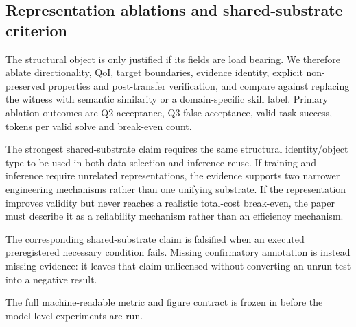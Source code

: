\subsection{Representation ablations and shared-substrate criterion}

The structural object is only justified if its fields are load bearing. We therefore ablate directionality, QoI, target boundaries, evidence identity, explicit non-preserved properties and post-transfer verification, and compare against replacing the witness with semantic similarity or a domain-specific skill label. Primary ablation outcomes are Q2 acceptance, Q3 false acceptance, valid task success, tokens per valid solve and break-even count.

The strongest shared-substrate claim requires the same structural identity/object type to be used in both data selection and inference reuse. If training and inference require unrelated representations, the evidence supports two narrower engineering mechanisms rather than one unifying substrate. If the representation improves validity but never reaches a realistic total-cost break-even, the paper must describe it as a reliability mechanism rather than an efficiency mechanism.

The corresponding shared-substrate claim is falsified when an executed preregistered necessary condition fails. Missing confirmatory annotation is instead missing evidence: it leaves that claim unlicensed without converting an unrun test into a negative result.

The full machine-readable metric and figure contract is frozen in  before the model-level experiments are run.
